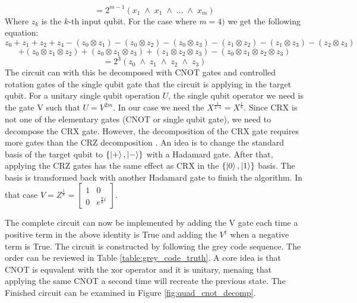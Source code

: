 \documentclass[12pt,a4paper]{article}
\begin{document}
\[
= 2^{m-1}(x_1 \; \land \; x_1 \; \land \; ... \; \land \; x_m)    
\]
Where \(z_k\) is the \(k\)-th input qubit. For the case where \(m=4)\) we get the following equation:
\[
z_0 + z_1 + z_2 + z_4 - (z_0 \otimes z_1) - (z_0 \otimes z_2) - (z_0 \otimes z_3) - (z_1 \otimes z_2) - (z_1 \otimes z_3) - (z_2 \otimes z_3) 
\] 
\[
+ (z_0 \otimes z_1 \otimes z_2) + (z_0 \otimes z_1 \otimes z_3) + (z_1 \otimes z_2 \otimes z_3) - (z_0 \otimes z_1 \otimes z_2 \otimes z_3) 
\] 
\[ 
= 2^{3}(z_0 \; \land \; z_1 \; \land \; z_2 \; \land \; z_3)
\]
The circuit can with this be decomposed with CNOT gates and controlled rotation gates of the single qubit gate that the circuit is applying in the target qubit. For a unitary single qubit operation \(U\), the single qubit operator we need is the gate V such that \(U = V^{2m}\). In our case we need the \(X^{\frac{1}{2 \cdot 4}} = X^{\frac{1}{8}}\). Since CRX is not one of the elementary gates (CNOT or single qubit gate), we need to decompose the CRX gate. However, the decomposition of the CRX gate requires more gates than the CRZ decomposition \cite{liu_analysis_2024}. An idea is to change the standard basis of the target qubit to \(\{\ket{+}, \ket{-}\}\) with a Hadamard gate. After that, applying the CRZ gates has the same effect as CRX in the \(\{\ket{0}, \ket{1}\}\) basis. The basis is transformed back with another Hadamard gate to finish the algorithm. In that case \(V = Z^{\frac{1}{8}} = \begin{bmatrix}1 & 0 \\ 0 & e^{\frac{\pi}{8}i} \end{bmatrix}\).

The complete circuit can now be implemented by adding the V gate each time a positive term in the above identity is True and adding the \(V^{\dagger}\) when a negative term is True. The circuit is constructed by following the grey code sequence. The order can be reviewed in Table \ref{table:grey_code_truth}. A core idea is that CNOT is equvalent with the xor operator and it is unitary, menaing that applying the same CNOT a second time will recreate the previous state. The Finished circuit can be examined in Figure \ref{fig:quad_cnot_decomp}.
\end{document}
